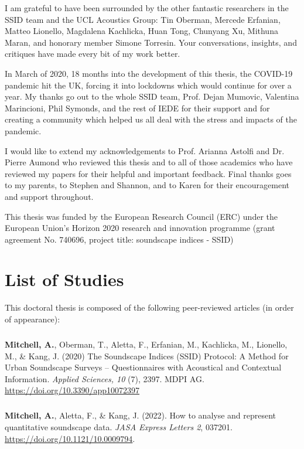 \documentclass[oneside,fontsize=11pt,titlepage,chapterprefix=true
]{scrbook}
\begin{document}
I am grateful to have been surrounded by the other fantastic researchers in the SSID team and the UCL Acoustics Group: Tin Oberman, Mercede Erfanian, Matteo Lionello, Magdalena Kachlicka, Huan Tong, Chunyang Xu, Mithuna Maran, and honorary member Simone Torresin. Your conversations, insights, and critiques have made every bit of my work better. 

In March of 2020, 18 months into the development of this thesis, the COVID-19 pandemic hit the UK, forcing it into lockdowns which would continue for over a year. My thanks go out to the whole SSID team, Prof. Dejan Mumovic, Valentina Marincioni, Phil Symonds, and the rest of IEDE for their support and for creating a community which helped us all deal with the stress and impacts of the pandemic. 

I would like to extend my acknowledgements to Prof. Arianna Astolfi and Dr. Pierre Aumond who reviewed this thesis and to all of those academics who have reviewed my papers for their helpful and important feedback. Final thanks goes to my parents, to Stephen and Shannon, and to Karen for their encouragement and support throughout.

This thesis was funded by the European Research Council (ERC) under the European Union’s Horizon 2020 research and innovation programme (grant agreement No. 740696, project title: soundscape indices - SSID)

\chapter*{List of Studies}

This doctoral thesis is composed of the following peer-reviewed articles (in order of appearance):

\paragraph*{}
\textbf{Mitchell, A.}, Oberman, T., Aletta, F., Erfanian, M., Kachlicka, M., Lionello, M., \& Kang, J. (2020) The Soundscape Indices (SSID) Protocol: A Method for Urban Soundscape Surveys -- Questionnaires with Acoustical and Contextual Information. \emph{Applied Sciences, 10} (7), 2397. MDPI AG. \url{https://doi.org/10.3390/app10072397}

\paragraph*{}
\textbf{Mitchell, A.}, Aletta, F., \& Kang, J. (2022). How to analyse and represent quantitative soundscape data. \emph{JASA Express Letters 2}, 037201. \url{https://doi.org/10.1121/10.0009794}.
\end{document}
